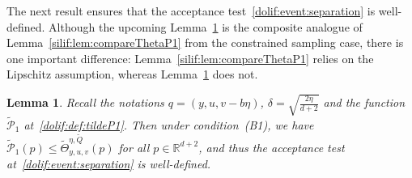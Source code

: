 \documentclass[11pt,letterpaper]{article}
\newcommand{\Q}{\widetilde{Q}}
\newtheorem{lemma}[thm]{Lemma}
\begin{document}

The next result ensures that the acceptance test~\eqref{dolif:event:separation} is well-defined.
Although the upcoming Lemma~\ref{dolif:lem:compareP1P2} is the composite analogue of
Lemma~\ref{silif:lem:compareThetaP1} from the constrained sampling case, there is one important difference:
Lemma~\ref{silif:lem:compareThetaP1} relies on the Lipschitz assumption, whereas
Lemma~\ref{dolif:lem:compareP1P2} does not.

\begin{lemma}\label{dolif:lem:compareP1P2}
Recall the notations $q=(y,u,v-b\eta)$, $\delta = \sqrt{\frac{2\eta}{d+2}}$ and the function $\widetilde{\mathcal{P}}_1$ at~\eqref{dolif:def:tildeP1}. Then under condition~(B1), we have $\widetilde{\mathcal{P}}_1( p)\le \widetilde{\Theta}_{y,u,v}^{\eta,\Q}( p)$ for all $ p\in\mathbb{R}^{d+2}$, and thus the acceptance test at~\eqref{dolif:event:separation} is well-defined.
\end{lemma}
\end{document}
